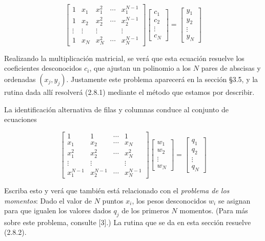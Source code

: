 \documentclass[10pt,a4paper]{book}
\begin{document}
\[
\begin{bmatrix}
1 & x_1 & x_1^2 & \cdots & x_1^{N-1} \\
1 & x_2 & x_2^2 & \cdots & x_2^{N-1} \\
\vdots & \vdots & \vdots & & \vdots \\
1 & x_N & x_N^2 & \cdots & x_N^{N-1}
\end{bmatrix}
\begin{bmatrix}
c_1 \\ c_2 \\ \vdots \\ c_N
\end{bmatrix}
=
\begin{bmatrix}
y_1 \\ y_2 \\ \vdots \\ y_N
\end{bmatrix}
\tag{2.8.1}
\]

Realizando la multiplicación matricial, se verá que esta ecuación resuelve los coeficientes desconocidos \(c_i\), que ajustan un polinomio a los \(N\) pares de abscisas y ordenadas \((x_j, y_j)\). Justamente este problema aparecerá en la sección §3.5, y la rutina dada allí resolverá (2.8.1) mediante el método que estamos por describir.

La identificación alternativa de filas y columnas conduce al conjunto de ecuaciones

\[
\begin{bmatrix}
1 & 1 & \cdots & 1 \\
x_1 & x_2 & \cdots & x_N \\
x_1^2 & x_2^2 & \cdots & x_N^2 \\
\vdots & \vdots & & \vdots \\
x_1^{N-1} & x_2^{N-1} & \cdots & x_N^{N-1}
\end{bmatrix}
\begin{bmatrix}
w_1 \\ w_2 \\ \vdots \\ w_N
\end{bmatrix}
=
\begin{bmatrix}
q_1 \\ q_2 \\ \vdots \\ q_N
\end{bmatrix}
\tag{2.8.2}
\]

Escriba esto y verá que también está relacionado con el \textit{problema de los momentos}: Dado el valor de \(N\) puntos \(x_i\), los pesos desconocidos \(w_i\) se asignan para que igualen los valores dados \(q_j\) de los primeros \(N\) momentos. (Para más sobre este problema, consulte [3].) La rutina que se da en esta sección resuelve (2.8.2).
\end{document}
